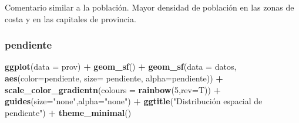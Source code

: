 \documentclass[12pt,a4paper,]{book}
\newenvironment{Shaded}{\begin{snugshade}}{\end{snugshade}}
\newcommand{\AttributeTok}[1]{\textcolor[rgb]{0.13,0.29,0.53}{#1}}
\newcommand{\CommentTok}[1]{\textcolor[rgb]{0.56,0.35,0.01}{\textit{#1}}}
\newcommand{\DecValTok}[1]{\textcolor[rgb]{0.00,0.00,0.81}{#1}}
\newcommand{\FunctionTok}[1]{\textcolor[rgb]{0.13,0.29,0.53}{\textbf{#1}}}
\newcommand{\NormalTok}[1]{#1}
\newcommand{\SpecialCharTok}[1]{\textcolor[rgb]{0.81,0.36,0.00}{\textbf{#1}}}
\newcommand{\StringTok}[1]{\textcolor[rgb]{0.31,0.60,0.02}{#1}}
\numberwithin{dummy}{section}
\theoremstyle{ocrenumbox}
\theoremstyle{blacknumex}
\theoremstyle{blacknumbox}
\theoremstyle{ocrenum}
\theoremstyle{ocrenum}
\begin{document}
\begin{Shaded}
\end{Shaded}

Comentario similar a la población. Mayor densidad de población en las
zonas de costa y en las capitales de provincia.

\hypertarget{pendiente}{%
\subsubsection{pendiente}\label{pendiente}}

\begin{Shaded}
\begin{Highlighting}[]
\FunctionTok{ggplot}\NormalTok{(}\AttributeTok{data =}\NormalTok{ prov) }\SpecialCharTok{+} 
  \FunctionTok{geom\_sf}\NormalTok{() }\SpecialCharTok{+}
  \FunctionTok{geom\_sf}\NormalTok{(}\AttributeTok{data =}\NormalTok{ datos, }\FunctionTok{aes}\NormalTok{(}\AttributeTok{color=}\NormalTok{pendiente, }\AttributeTok{size=}\NormalTok{ pendiente, }\AttributeTok{alpha=}\NormalTok{pendiente)) }\SpecialCharTok{+}
    \FunctionTok{scale\_color\_gradientn}\NormalTok{(}\AttributeTok{colours =} \FunctionTok{rainbow}\NormalTok{(}\DecValTok{5}\NormalTok{,}\AttributeTok{rev=}\NormalTok{T)) }\SpecialCharTok{+}
  \FunctionTok{guides}\NormalTok{(}\AttributeTok{size=}\StringTok{"none"}\NormalTok{,}\AttributeTok{alpha=}\StringTok{"none"}\NormalTok{) }\SpecialCharTok{+}
  \FunctionTok{ggtitle}\NormalTok{(}\StringTok{"Distribución espacial de pendiente"}\NormalTok{) }\SpecialCharTok{+}
  \FunctionTok{theme\_minimal}\NormalTok{()}
\end{Highlighting}
\end{Shaded}
\end{document}
